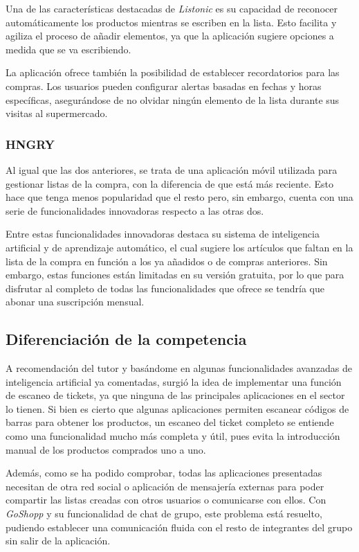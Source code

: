 \documentclass{article}
\begin{document}
Una de las características destacadas de \textit{Listonic} es su capacidad de reconocer automáticamente los productos mientras se escriben en la lista. Esto facilita y agiliza el proceso de añadir elementos, ya que la aplicación sugiere opciones a medida que se va escribiendo.

La aplicación ofrece también la posibilidad de establecer recordatorios para las compras. Los usuarios pueden configurar alertas basadas en fechas y horas específicas, asegurándose de no olvidar ningún elemento de la lista durante sus visitas al supermercado.

\subsubsection{HNGRY}

Al igual que las dos anteriores, se trata de una aplicación móvil utilizada para gestionar listas de la compra, con la diferencia de que está más reciente. Esto hace que tenga menos popularidad que el resto pero, sin embargo, cuenta con una serie de funcionalidades innovadoras respecto a las otras dos.

Entre estas funcionalidades innovadoras destaca su sistema de inteligencia artificial y de aprendizaje automático, el cual sugiere los artículos que faltan en la lista de la compra en función a los ya añadidos o de compras anteriores. Sin embargo, estas funciones están limitadas en su versión gratuita, por lo que para disfrutar al completo de todas las funcionalidades que ofrece se tendría que abonar una suscripción mensual.

\subsection{Diferenciación de la competencia}

A recomendación del tutor y basándome en algunas funcionalidades avanzadas de inteligencia artificial ya comentadas, surgió la idea de implementar una función de escaneo de tickets, ya que ninguna de las principales aplicaciones en el sector lo tienen. Si bien es cierto que algunas aplicaciones permiten escanear códigos de barras para obtener los productos, un escaneo del ticket completo se entiende como una funcionalidad mucho más completa y útil, pues evita la introducción manual de los productos comprados uno a uno.

Además, como se ha podido comprobar, todas las aplicaciones presentadas necesitan de otra red social o aplicación de mensajería externas para poder compartir las listas creadas con otros usuarios o comunicarse con ellos. Con \textit{GoShopp} y su funcionalidad de chat de grupo, este problema está resuelto, pudiendo establecer una comunicación fluida con el resto de integrantes del grupo sin salir de la aplicación.
\end{document}

